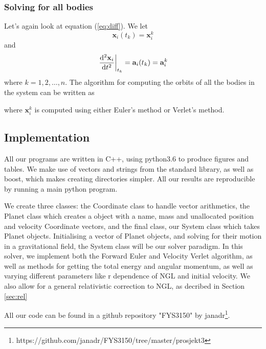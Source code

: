 \subsubsection{Solving for all bodies}
Let's again look at equation (\ref{eq:diff}). We let
\begin{equation}
\mathbf{x}_i(t_k)=\mathbf{x}_{i}^k
\end{equation}
and
\begin{equation}
\left.\dv[2]{\mathbf{x}_i}{t}\right\rvert_{t_k} = \mathbf{a}_i(t_k)=\mathbf{a}_{i}^k
\end{equation}
where $k=1,2,\ldots,n$. The algorithm for computing the orbits of all the bodies in the system can be written as
\begin{algorithm}[h!]
	\SetAlgoLined
\end{algorithm}
where $\mathbf{x}_{i}^k$ is computed using either Euler's method or Verlet's method.

\subsection{Implementation}
All our programs are written in C++, using python3.6 to produce figures and tables.
We make use of vectors and strings from the standard library, as well as boost,
which makes creating directories simpler. All our results are reproducible
by running a main python program.

We create three classes: the Coordinate class to handle vector arithmetics, the Planet
class which creates a object with a name, mass and unallocated position and velocity Coordinate vectors,
and the final class, our System class which takes Planet objects. Initialising
a vector of Planet objects, and solving for their motion in a gravitational field, the System
class will be our solver paradigm. In this solver, we implement both the Forward Euler and
Velocity Verlet algorithm, as well as methods for getting the total energy and angular
momentum, as well as varying different parameters like r dependence of NGL and initial velocity.
We also allow for a general relativistic correction to NGL, as decribed in Section \ref{sec:rel}

All our code can be found in
a github repository "FYS3150" by janadr\footnote{https://github.com/janadr/FYS3150/tree/master/prosjekt3}.
